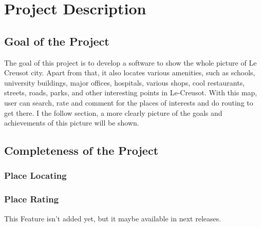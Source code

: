 \documentclass[a4paper,english]{book}
\begin{document}
\chapter{Project Description}
\section{Goal of the Project}


The goal of this project is to develop a software to show the whole picture of Le Creusot city. 
Apart from that, it also locates various amenities, such as schools, university 
buildings, major offices, hospitals, various shops, cool restaurants, streets, roads, parks, 
and other interesting points in Le-Creusot. With this map, user can search, rate and comment 
for the places of interests and do routing to get there. I the follow section, a more clearly picture
of the goals and achievements of this picture will be shown.

\section{Completeness of the Project}
\subsection{Place Locating}



\subsection{Place Rating}
This Feature isn't added yet, but it maybe available in next releases.
\end{document}
